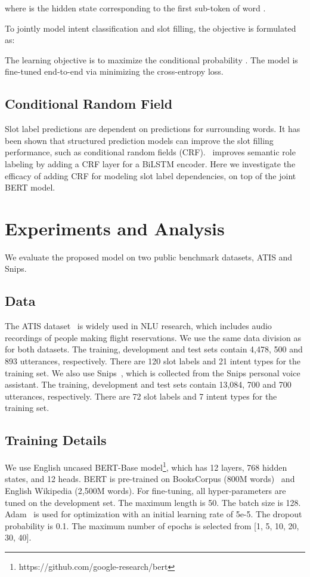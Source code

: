 \documentclass[11pt,a4paper]{article}
\begin{document}
\noindent where  is the hidden state corresponding to the first sub-token of word .

To jointly model intent classification and slot filling, the objective is formulated as:

The learning objective is to maximize the conditional probability . The model is fine-tuned end-to-end via minimizing the cross-entropy loss.

\subsection{Conditional
Random Field }
Slot label predictions are dependent on predictions for surrounding words. It has been shown that structured prediction models can improve the slot filling performance, such as conditional random fields (CRF).~\citet{DBLP:conf/acl/ZhouX15} improves semantic role labeling by adding a CRF layer for a BiLSTM encoder. Here we investigate the efficacy of adding CRF for modeling slot label dependencies, on top of the joint BERT model.

\section{Experiments and Analysis}

We evaluate the proposed model on two public benchmark datasets, ATIS and Snips. 

\subsection{Data}
The ATIS dataset~\citep{DBLP:conf/slt/TurHH10} is widely used in NLU research, which includes audio recordings of people making flight reservations.  We use the same data division as~\citet{DBLP:conf/naacl/GooGHHCHC18} for both datasets.
The training, development and test sets contain 4,478, 500 and 893 utterances, respectively. There are 120 slot labels and 21 intent types for the training set.
We also use Snips~\citep{DBLP:journals/corr/abs-1805-10190}, which is collected from the Snips personal voice assistant. The training, development and test sets contain 13,084, 700 and 700 utterances, respectively. There are 72 slot labels and 7 intent types for the training set. 


\subsection{Training Details}
We use English uncased BERT-Base model\footnote{https://github.com/google-research/bert}, which has 12 layers, 768 hidden states, and 12 heads. BERT is pre-trained on BooksCorpus (800M words)~\citep{DBLP:conf/iccv/ZhuKZSUTF15} and English Wikipedia (2,500M words). For fine-tuning, all hyper-parameters are tuned on the development set. The maximum length is 50. The batch size is 128. Adam~\cite{DBLP:journals/corr/KingmaB14} is used for optimization with an initial learning rate of 5e-5. The dropout probability is 0.1. 
The maximum number of epochs is selected from [1, 5, 10, 20, 30, 40].
\end{document}

